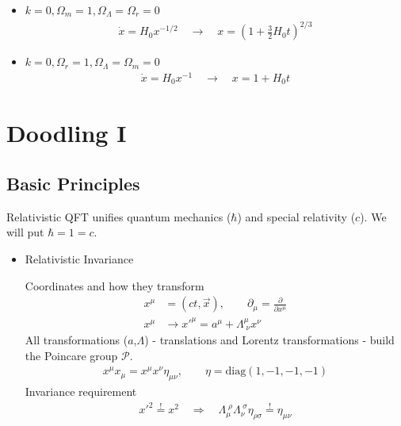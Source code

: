 \documentclass[10pt,a4paper]{article}
\theoremstyle{definition}
\begin{document}
\begin{enumerate}
\begin{itemize}
\item $k=0, \Omega_m=1,\Omega_\Lambda=\Omega_r=0$
\begin{align}
\dot{x}=H_0x^{-1/2}\quad\rightarrow\quad x=\left(1+\frac{3}{2}H_0t\right)^{2/3}
\end{align}

\item $k=0, \Omega_r=1,\Omega_\Lambda=\Omega_m=0$
\begin{align}
\dot{x}=H_0x^{-1}\quad\rightarrow\quad x=1+H_0t
\end{align}


\end{itemize}
\end{enumerate}
\newpage
\section{Doodling I}
\subsection{Basic Principles}
Relativistic QFT unifies quantum mechanics ($\hbar$) and special relativity ($c$). We will put $\hbar=1=c$.
\begin{itemize}
\item Relativistic Invariance

Coordinates and how they transform
\begin{align}
x^\mu&=(ct,\vec{x}), \qquad \partial_\mu=\frac{\partial}{\partial x^\mu}\\
x^\mu&\rightarrow x'^{\mu}=a^\mu+\Lambda^\mu_{\;\nu}x^\nu
\end{align}
All transformations ($a$,$\Lambda$) - translations and Lorentz transformations - build the Poincare group $\mathcal{P}$.
\begin{align}
x^\mu x_\mu=x^\mu x^\nu\eta_{\mu\nu}, \qquad \eta=\text{diag}(1,-1,-1,-1)
\end{align}
Invariance requirement
\begin{align}
x'^2\overset{!}{=}x^2\quad\Rightarrow\quad \Lambda_\mu^{\;\rho}\Lambda_\nu^{\;\sigma}\eta_{\rho\sigma}\overset{!}{=}\eta_{\mu\nu}
\end{align}
\end{itemize}
\end{document}
